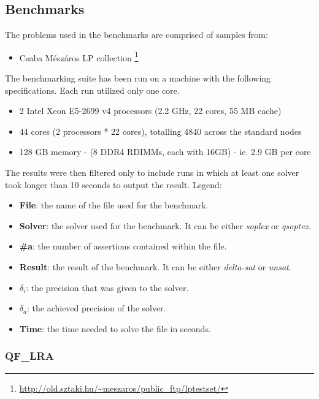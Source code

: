 \begin{appendices}
    \chapter{Benchmarks}\label{appendix:benchmarks}
    The problems used in the benchmarks are comprised of samples from:

    \begin{itemize}
        \item Csaba Mészáros LP collection  \footnote{\url{http://old.sztaki.hu/~meszaros/public_ftp/lptestset/}}
    \end{itemize}
    The benchmarking suite has been run on a machine with the following specifications.
    Each run utilized only one core.

    \begin{itemize}
        \item 2 Intel Xeon E5-2699 v4 processors (2.2 GHz, 22 cores, 55 MB cache)
        \item 44 cores (2 processors * 22 cores), totalling 4840 across the standard nodes
        \item 128 GB memory - (8 DDR4 RDIMMs, each with 16GB) - ie. 2.9 GB per core
    \end{itemize}
    The results were then filtered only to include runs in which at least one solver took longer than 10 seconds to output the result.
    Legend:

    \begin{itemize}
        \item \textbf{File}: the name of the file used for the benchmark.
        \item \textbf{Solver}: the solver used for the benchmark. It can be either \textit{soplex} or \textit{qsoptex}.
        \item \textbf{\#a}: the number of assertions contained within the file.
        \item \textbf{Result}: the result of the benchmark. It can be either \textit{delta-sat} or \textit{unsat}.
        \item \textbf{$\delta_i$}: the precision that was given to the solver.
        \item \textbf{$\delta_a$}: the achieved precision of the solver.
        \item \textbf{Time}: the time needed to solve the file in seconds.
    \end{itemize}

    \subsection*{QF_LRA}


\end{appendices}
